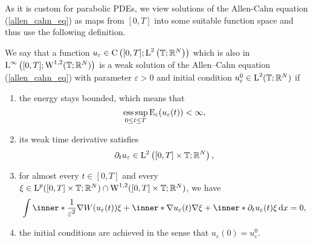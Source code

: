 As it is custom for parabolic PDEs, we view solutions of the Allen-Cahn equation (\ref{allen_cahn_eq}) as maps from $ [0,T] $ into some suitable function space and thus use the following definition.

\begin{definition}
	\label{solution_to_ac}
	We say that a function 
	$ u_{ \varepsilon} \in 
	\mathrm{ C } \left( [0 , T ] ; \operatorname{L}^{ 2 } \left( \operatorname{\mathbb{T}}; \mathbb{ R }^{ N } \right) \right) $
	which is also in
	$\operatorname{L}^{ \infty } \left( [0, T ]; \operatorname{W}^{ 1, 2 } ( \operatorname{\mathbb{T}} ; \mathbb{ R }^{ N } ) \right)
	$
	is a weak solution of the Allen--Cahn equation (\ref{allen_cahn_eq}) with parameter $ \varepsilon > 0 $ and initial condition $ u_{ \varepsilon}^{ 0 } \in \operatorname{L}^{ 2 } ( \operatorname{\mathbb{T}} ; \mathbb{ R }^{ N } ) $ if
	\begin{enumerate}
		\item the energy stays bounded, which means that
		\begin{equation}
			\operatorname*{ess\,sup}_{ 0 \leq t \leq T }
				\operatorname{E}_{ \varepsilon } ( u_{ \varepsilon } ( t ) ) 
			< \infty,
		\end{equation}
		\item 
		its weak time derivative satisfies
		\begin{equation}
			\partial_{ t } u_{ \varepsilon }
			\in
			\operatorname{L}^{ 2 } \left( [ 0 , T ] \times \operatorname{\mathbb{T}} ; \mathbb{ R }^{ N } \right),
		\end{equation}
		\item 
		for almost every $ t \in [ 0 , T ] $ and every 
		$ \xi \in \operatorname{L}^{ p } ( [ 0 , T ] \times \operatorname{\mathbb{T}}; \mathbb{ R }^{ N } ) 
		\cap
		\operatorname{W}^{ 1, 2 } ( [ 0, T ] \times \operatorname{\mathbb{T}} ; \mathbb{ R }^{ N } ) $,
		we have
		\begin{equation}
			\label{ac_weak_equation}
			\int
				\inner*{ \frac{ 1 }{ \varepsilon^{ 2 } } \nabla W ( u_{ \varepsilon} ( t ) ) }{ \xi }
				+
				\inner*{ \nabla u_{ \varepsilon } ( t ) }{ \nabla \xi } 
				+
				\inner*{\partial_{ t } u_{ \varepsilon} ( t ) }{ \xi }
			\dd{x}
			=
			0,
		\end{equation}
		\item 
		the initial conditions are achieved in the sense that $ u_{ \varepsilon } ( 0 ) = u_{ \varepsilon}^{ 0 } $.
	\end{enumerate}
\end{definition}

